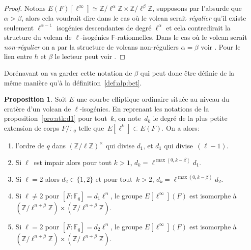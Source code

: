 \documentclass[10pt,a4paper]{book}
\theoremstyle{plain}
\theoremstyle{definition}
\theoremstyle{definition}
\theoremstyle{definition}
\newtheorem{prop}[thm]{Proposition}
\theoremstyle{definition}
\theoremstyle{remark}
\theoremstyle{remark}
\theoremstyle{definition}
\begin{document}
\begin{proof}
Notons $E(F)[\ell^{\infty}]\simeq \mathbb{Z}/ \ell^{\alpha} \mathbb{Z} 
\times \mathbb{Z}/ \ell^{\beta} \mathbb{Z}$, supposons par l'absurde que 
$\alpha > \beta$, alors cela voudrait dire dans le cas où le volcan serait 
\emph{régulier} qu'il existe seulement $\ell^{\alpha-1}$ isogénies descendantes
de degré $\ell^{\alpha}$ et cela contredirait la structure du volcan de 
$\ell$-isogénies $\mathsf{F}$-rationnelles. Dans le cas où le volcan serait 
\emph{non-régulier} on a par la structure de volcans non-réguliers 
$\alpha=\beta$ voir \cite[§5.3.1]{Ionica2010}. Pour le lien entre $h$ et
 $\beta$ le lecteur peut voir \cite[§5.3.1]{Ionica2010}. 
\end{proof}

Dorénavant on va garder cette notation de $\beta$ qui peut donc être définie de
la même manière qu'à la définition~\ref{def:alp:bet}. %

\begin{prop}\label{pro:clas:fro:atk}
Soit $E$ une courbe elliptique ordinaire située au niveau du cratère d'un 
volcan de $\ell$-isogénies. En reprenant les notations de la 
proposition~\ref{pro:atk:d1} pour tout~$k$, on note~$d_k$ le degré de la plus 
petite extension de corps $F/\mathbb{F}_q$ telle que~$E[\ell^k]\subset E(F)$. 
On  a alors:
\begin{enumerate}
\item l'ordre de $q$ dans $(\mathbb{Z}/ \ell \mathbb{Z})^\times$ qui divise $d_1$,
et $d_1$ qui divise~$(\ell-1)$.
\item Si $\ell$~est impair alors pour tout $k > 1$,
$ d_k = \ell^{\max (0, k - \beta)}d_1$.
\item Si $\ell=2$ alors $d_2 \in \{1,2\}$ et pour tout~$k > 2$,
$d_k = \ell^{\max (0, k - \beta)}d_2$.
\item Si $\ell \neq 2$ pour $[F:\mathbb{F}_q]=d_1\ell^n$, le groupe $E[\ell^{\infty}](F)$ est isomorphe à~$(\mathbb{Z}/\ell^{n+\beta} \mathbb{Z}) \times (\mathbb{Z}/\ell^{n+\beta} \mathbb{Z})$.
\item Si $\ell = 2$ pour $[F:\mathbb{F}_q]=d_2\ell^n$, le groupe $E[\ell^{\infty}](F)$ est isomorphe à~$(\mathbb{Z}/\ell^{n+\beta} \mathbb{Z}) \times (\mathbb{Z}/\ell^{n+\beta} \mathbb{Z})$.
\end{enumerate}
\end{prop}
\end{document}
